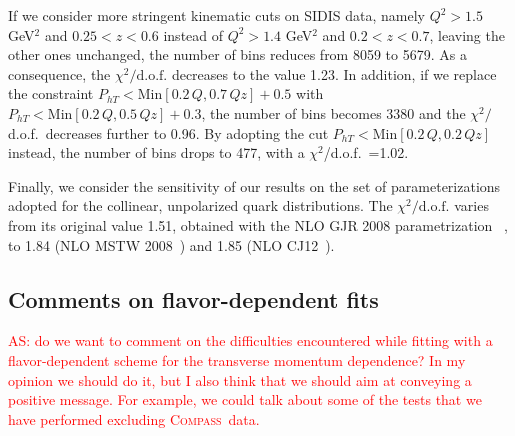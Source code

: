 \documentclass[aps,preprintnumbers,showpacs,nofootinbib,superscriptaddress,floatfix]{revtex4}
\newcommand{\compass}{\textsc{Compass}}
\begin{document}
If we consider more stringent kinematic cuts on SIDIS data, namely $Q^2 > 1.5$ GeV$^2$ and $0.25 < z < 0.6$ instead of $Q^2 > 1.4$ GeV$^2$ and $0.2 < z < 0.7$, leaving the other ones unchanged,  the number of bins reduces from 8059 to 5679.  As a consequence, the  $\chi^2/ \text{d.o.f.}$  decreases to the value 1.23. In addition, if we replace the constraint  $P_{h T} < \text{Min} [ 0.2\, Q, 0.7\, Q z] + 0.5$  with $P_{h T} < \text{Min} [ 0.2\, Q, 0.5\, Q z] + 0.3$, the number of bins becomes 3380 and the $\chi^2/$d.o.f.\ decreases further to 0.96. By adopting the cut $P_{h T} < \text{Min} [ 0.2\, Q, 0.2\, Q z]$ instead, the number of bins drops to 477, with  a
 $\chi^2$/d.o.f.\ =1.02. 

Finally, we consider the sensitivity of our results on the set of parameterizations adopted for the collinear, unpolarized quark distributions. The $\chi^2/ \text{d.o.f.}$ varies from its original value 1.51, obtained with the NLO GJR 2008 parametrization ~\cite{Gluck:2007ck}, to  1.84 (NLO MSTW 2008~\cite{Martin:2009iq})   and 1.85 (NLO CJ12~\cite{Owens:2012bv}).  

\subsection{Comments on flavor-dependent fits}
\label{ss:comment_fldep}

\textcolor{red}{AS: do we want to comment on the difficulties encountered while fitting with a flavor-dependent scheme for the transverse momentum dependence? In my opinion we should do it, but I also think that we should aim at conveying a positive message. For example, we could talk about some of the tests that we have performed excluding \compass\ data.}
\end{document}
